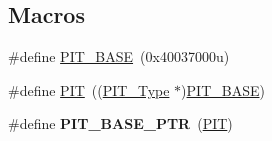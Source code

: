 \subsection*{Macros}
\begin{DoxyCompactItemize}
\item 
\#define \hyperlink{group__PIT__Peripheral__Access__Layer_gaf00b86ba33a2cfe7bb100b4f01905f41}{P\+I\+T\+\_\+\+B\+A\+SE}~(0x40037000u)
\item 
\#define \hyperlink{group__PIT__Peripheral__Access__Layer_gaf181c9e6602b6432a0bf1a9243808968}{P\+IT}~((\hyperlink{structPIT__Type}{P\+I\+T\+\_\+\+Type} $\ast$)\hyperlink{group__PIT__Peripheral__Access__Layer_gaf00b86ba33a2cfe7bb100b4f01905f41}{P\+I\+T\+\_\+\+B\+A\+SE})
\item 
\#define {\bfseries P\+I\+T\+\_\+\+B\+A\+S\+E\+\_\+\+P\+TR}~(\hyperlink{group__PIT__Peripheral__Access__Layer_gaf181c9e6602b6432a0bf1a9243808968}{P\+IT})\hypertarget{group__PIT__Peripheral__Access__Layer_ga70be45f58402a8e6d2ce4df7b23aa41c}{}\label{group__PIT__Peripheral__Access__Layer_ga70be45f58402a8e6d2ce4df7b23aa41c}


\end{DoxyCompactItemize}

